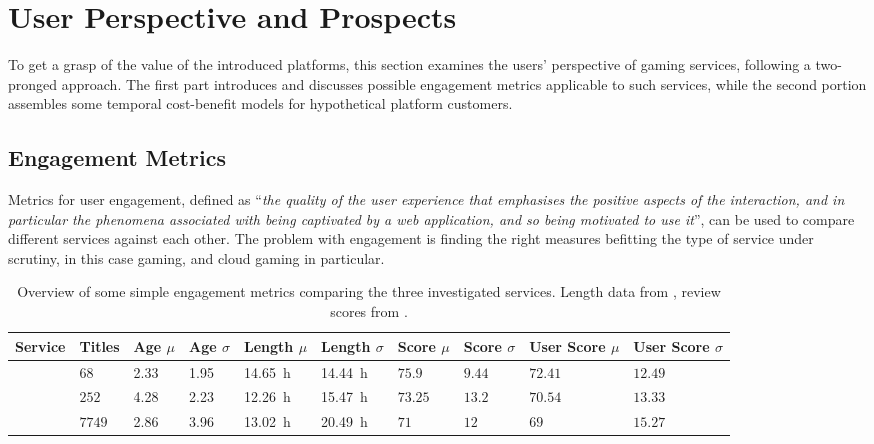\section{User Perspective and Prospects}
\label{sec:engagement}

To get a grasp of the value of the introduced platforms, this section examines the users' perspective of gaming services, following a two-pronged approach. The first part introduces and discusses possible engagement metrics applicable to such services, while the second portion assembles some temporal cost-benefit models for hypothetical platform customers.


\subsection{Engagement Metrics}

Metrics for user engagement, defined as ``\textit{the quality of the user experience that emphasises the positive aspects of the interaction, and in particular the phenomena associated with being captivated by a web application, and so being motivated to use it}''\cite{Lehmann2012}, can be used to compare different services against each other. The problem with engagement is finding the right measures befitting the type of service under scrutiny, in this case gaming, and cloud gaming in particular.

\begin{table}
\centering
\caption{Overview of some simple engagement metrics comparing the three investigated services. Length data from \hltb, review scores from \metacritic.}
\label{tab:basic-engagement}
	\begin{tabu}{X[2]|X[r]X[r]X[r]X[r]X[r]X[r]X[r]X[r]X[r]}
	\toprule
	Service & Titles & Age $\mu$ & Age $\sigma$ & Length $\mu$ & Length $\sigma$ & Score $\mu$ & Score $\sigma$ & User Score $\mu$ & User Score $\sigma$\\
	\midrule
	\gfnow & $68$ & \SI{2.33}{\year} & \SI{1.95}{\year} & \SI{14.65}{\hour} & \SI{14.44}{\hour} & $75.9$ & $9.44$ & $72.41$ & $12.49$\\
	\psnow & $252$ & \SI{4.28}{\year} & \SI{2.23}{\year} & \SI{12.26}{\hour} & \SI{15.47}{\hour} & $73.25$ & $13.2$ & $70.54$ & $13.33$\\
	\steam & $7749$ & \SI{2.86}{\year} & \SI{3.96}{\year} & \SI{13.02}{\hour} & \SI{20.49}{\hour} & $71$ & $12$ & $69$ & $15.27$\\
	\bottomrule
	\end{tabu}
\end{table}

